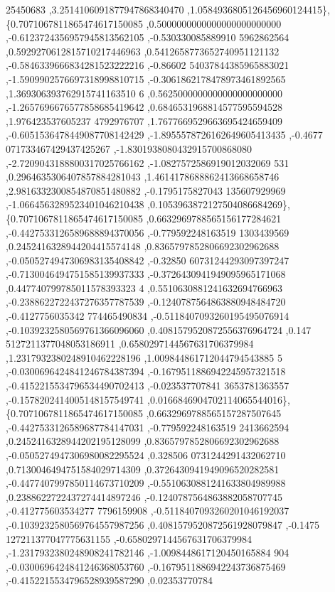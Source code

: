 \begin{DoxyCode}
      25450683 ,3.2514106091877947868340470 ,1.0584936805126456960124415\},
\{0.7071067811865474617150085 ,0.5000000000000000000000000 ,-0.6123724356957945813562105 ,-0.530330085889910
      5962862564 ,0.5929270612815710217446963 ,0.5412658773652740951121132 ,-0.5846339666834281523222216 ,-0.86602
      54037844385965883021 ,-1.5909902576697318998810715 ,-0.3061862178478973461892565 ,1.369306393762915741163510
      6 ,0.5625000000000000000000000 ,-1.2657696676577858685419642 ,0.6846531968814577595594528 ,1.976423537605237
      4792976707 ,1.7677669529663695424659409 ,-0.6051536478449087708142429 ,-1.8955578726162649605413435 ,-0.4677
      071733467429437425267 ,-1.8301938080432915700868080 ,-2.7209043188800317025766162 ,-1.0827572586919012032069
      531 ,0.2964635306407857884281043 ,1.4614178688862413668658746 ,2.9816332300854870851480882 ,-0.1795175827043
      135607929969 ,-1.0664563289523401046210438 ,0.1053963872127504086684269\},
\{0.7071067811865474617150085 ,0.6632969788565156177284621 ,-0.4427533126589688894370056 ,-0.779592248163519
      1303439569 ,0.2452416328944204415574148 ,0.8365797852806692302962688 ,-0.0505274947306983135408842 ,-0.32850
      60731244293097397247 ,-0.7130046494751585139937333 ,-0.3726430941949095965171068 ,0.447740799785011578393323
      4 ,0.5510630881241632694766963 ,-0.2388622722437276357787539 ,-0.1240787564863880948484720 ,-0.4127756035342
      774465490834 ,-0.5118407093260195495076914 ,-0.1039232580569761366096060 ,0.4081579520872556376964724 ,0.147
      5127211377048053186911 ,0.6580297144567631706379984 ,1.2317932380248910462228196 ,1.009844861712044794543885
      5 ,-0.0300696424841246784387394 ,-0.1679511886942245957321518 ,-0.4152215534796534490702413 ,-0.023537707841
      3653781363557 ,-0.1578202414005148157549741 ,0.0166846904702114065544016\},
\{0.7071067811865474617150085 ,0.6632969788565157287507645 ,-0.4427533126589687784147031 ,-0.779592248163519
      2413662594 ,0.2452416328944202195128099 ,0.8365797852806692302962688 ,-0.0505274947306980082295524 ,0.328506
      0731244291432062710 ,0.7130046494751584029714309 ,0.3726430941949096520282581 ,-0.4477407997850114673710209 
      ,-0.5510630881241633804989988 ,0.2388622722437274414897246 ,-0.1240787564863882058707745 ,-0.412775603534277
      7796159908 ,-0.5118407093260201046192037 ,-0.1039232580569764557987256 ,0.4081579520872561928079847 ,-0.1475
      127211377047775631155 ,-0.6580297144567631706379984 ,-1.2317932380248908241782146 ,-1.0098448617120450165884
      904 ,-0.0300696424841246368053760 ,-0.1679511886942243736875469 ,-0.4152215534796528939587290 ,0.02353770784

\end{DoxyCode}
